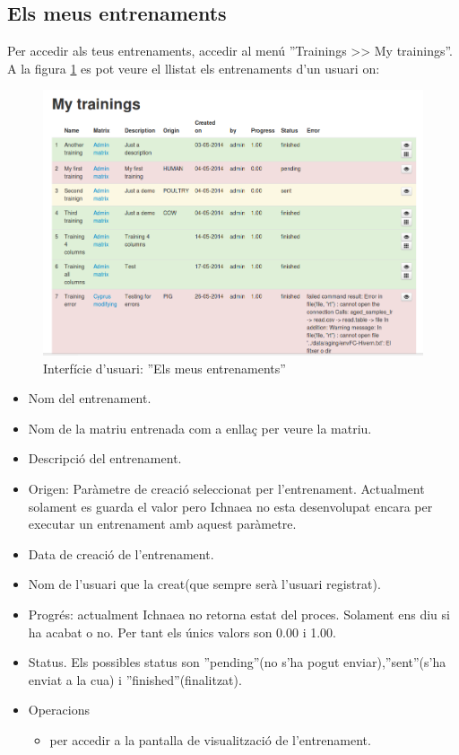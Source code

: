 \subsection{Els meus entrenaments}
\label{subsec:myTrainings}
Per accedir als teus entrenaments, accedir al menú ''Trainings >> My trainings''. A la figura \ref{fig:my_trainings} es pot veure el llistat els entrenaments d'un usuari on:
\begin{figure}[h!]
  \centering
  \includegraphics[scale=0.4]{img/userguide/my_trainings.png}
  \caption{Interfície d'usuari: ''Els meus entrenaments''}
  \label{fig:my_trainings}
\end{figure}

\begin{itemize}
\item Nom del entrenament.
\item Nom de la matriu entrenada com a enllaç per veure la matriu.
\item Descripci\'{o} del entrenament.
\item Origen: Paràmetre de creació seleccionat per l'entrenament. Actualment solament es guarda el valor pero Ichnaea no esta desenvolupat encara per executar un entrenament amb aquest paràmetre.
\item Data de creaci\'{o} de l'entrenament.
\item Nom de l'usuari que la creat(que sempre serà l'usuari registrat).
\item Progr\'{e}s: actualment Ichnaea no retorna estat del proces. Solament ens diu si ha acabat o no. Per tant els \'{u}nics valors son 0.00 i 1.00.
\item Status. Els possibles status son ''pending''(no s'ha pogut enviar),''sent''(s'ha enviat a la cua) i ''finished''(finalitzat). 
\item Operacions
 \begin{itemize}
 \item \iconeyeopen per accedir a la pantalla de visualització de l'entrenament.
 \end{itemize}
\end{itemize}

